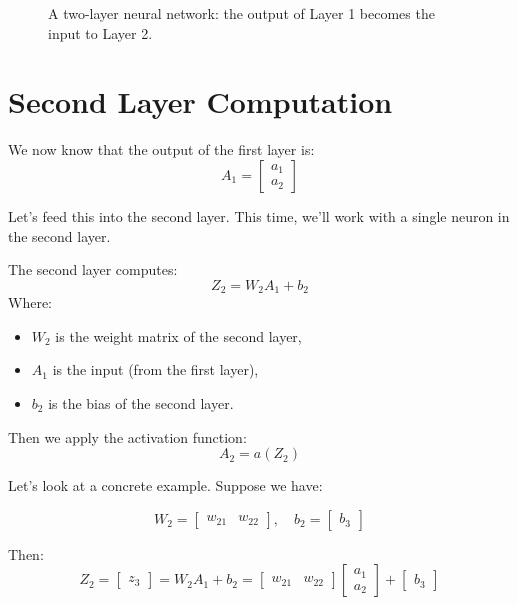 \documentclass[11pt]{article}
\begin{document}
\begin{figure}[H]
\caption{A two-layer neural network: the output of Layer 1 becomes the input to Layer 2.}
\end{figure}

\section{Second Layer Computation}

We now know that the output of the first layer is:
\[
A_1 =
\begin{bmatrix}
a_1 \\
a_2
\end{bmatrix}
\]

Let’s feed this into the second layer.  
This time, we’ll work with a single neuron in the second layer.

\begin{defbox}[title=Layer 2 Computation]
The second layer computes:
\[
Z_2 = W_2 A_1 + b_2
\]
Where:
\begin{itemize}
  \item $W_2$ is the weight matrix of the second layer,
  \item $A_1$ is the input (from the first layer),
  \item $b_2$ is the bias of the second layer.
\end{itemize}
\end{defbox}

Then we apply the activation function:
\[
A_2 = a(Z_2)
\]

Let’s look at a concrete example.  
Suppose we have:

\[
W_2 = \begin{bmatrix} w_{21} & w_{22} \end{bmatrix}, \quad
b_2 = \begin{bmatrix} b_3 \end{bmatrix}
\]

Then:
\[
Z_2 = 
\begin{bmatrix}
z_3
\end{bmatrix}
= W_2 A_1 + b_2 = 
\begin{bmatrix}
w_{21} & w_{22}
\end{bmatrix}
\begin{bmatrix}
a_1 \\
a_2
\end{bmatrix}
+
\begin{bmatrix}
b_3
\end{bmatrix}
\]
\end{document}
